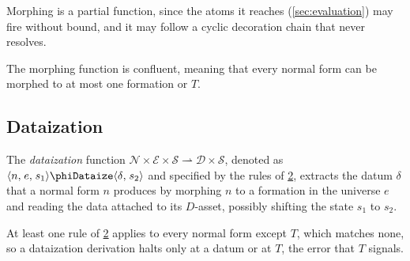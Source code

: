 Morphing is a partial function, since the atoms it reaches
  (\cref{sec:evaluation}) may fire without bound,
  and it may follow a cyclic decoration chain that never resolves.

\begin{figure}
\begin{mdframed}
\centering
{}

\end{mdframed}
\label{fig:morphing}
\end{figure}

\begin{theorem}\label{thm:morphing-confluent}
The morphing function is confluent, meaning that
  every normal form can be morphed to at most one formation or $T$.
\end{theorem}

\subsection{Dataization}\label{sec:dataization}

\begin{definition}[Dataization]
The \emph{dataization} function
  \(\mathcal{N} \times \mathcal{E} \times \mathcal{S}
    \rightharpoonup \mathcal{D} \times \mathcal{S}\),
  denoted as \(\phinoDataize{n}{e}{s_1}{\delta}{s_2}\)
  and specified by the rules of \cref{fig:dataization},
  extracts the datum \(\delta\) that a normal form \(n\) produces
  by morphing \(n\) to a formation in the universe \(e\)
  and reading the data attached to its $D$-asset,
  possibly shifting the state \(s_1\) to \(s_2\).
\end{definition}

\begin{theorem}[Progress]\label{thm:dataization-progress}
At least one rule of \cref{fig:dataization} applies to every normal form except
  $T$, which matches none, so a dataization derivation halts only at a datum or
  at $T$, the error that $T$ signals.
\end{theorem}

\begin{figure}
\begin{mdframed}
\centering
{}

\end{mdframed}
\label{fig:dataization}
\end{figure}

